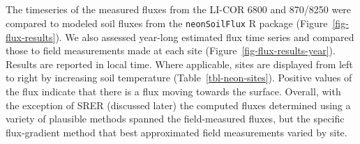 \documentclass[
  letterpaper,
  DIV=11,
  numbers=noendperiod]{scrartcl}
\providecommand{\DIFdelbegin}{} %
\providecommand{\DIFdelend}{} %
\newcommand{\DIFscaledelfig}{0.5}
\newlength{\DIFdelgraphicswidth} %
\newlength{\DIFdelgraphicsheight} %
\newcommand{\DIFdelincludegraphics}[2][]{%
\sbox{\DIFdelgraphicsbox}{\DIFOincludegraphics[#1]{#2}}%
\settoboxwidth{\DIFdelgraphicswidth}{\DIFdelgraphicsbox} %
\settoboxtotalheight{\DIFdelgraphicsheight}{\DIFdelgraphicsbox} %
\scalebox{\DIFscaledelfig}{%
\parbox[b]{\DIFdelgraphicswidth}{\usebox{\DIFdelgraphicsbox}\\[-\baselineskip] \rule{\DIFdelgraphicswidth}{0em}}\llap{\resizebox{\DIFdelgraphicswidth}{\DIFdelgraphicsheight}{%
\setlength{\unitlength}{\DIFdelgraphicswidth}%
\begin{picture}(1,1)%
\thicklines\linethickness{2pt} %
{\color[rgb]{1,0,0}\put(0,0){\framebox(1,1){}}}%
{\color[rgb]{1,0,0}\put(0,0){\line( 1,1){1}}}%
{\color[rgb]{1,0,0}\put(0,1){\line(1,-1){1}}}%
\end{picture}%
}\hspace*{3pt}}} %
} %
\DeclareRobustCommand{\DIFdelbegin}{\DIFOdelbegin \let\includegraphics\DIFdelincludegraphics} %
\DeclareRobustCommand{\DIFdelend}{\DIFOaddend \let\includegraphics\DIFOincludegraphics} %
\begin{document}
\begin{table}

\caption{\label{tbl-licor-results}Summary of measured soil
characteristics and flux results from field measurements across six NEON
sites using a LI-COR 6800 (LI-870/8250 measurements omitted to enable
direct comparability) via the closed-dynamic chamber method. Numeric
values for soil CO\(_{2}\) flux, soil temperature, and volumetric soil
water content (VSWC) are the mean and standard deviation of field
measurements at each site.}


\end{table}%

\DIFdelbegin \subsection{%
}%
\addtocounter{subsection}{-1}%

\DIFdelend The timeseries of the measured fluxes from the LI-COR 6800 and 870/8250
were compared to modeled soil fluxes from the \texttt{neonSoilFlux} R
package (Figure~\ref{fig-flux-results}). We also assessed year-long
estimated flux time series and compared those to field measurements made
at each site (Figure~\ref{fig-flux-results-year}). Results are reported
in local time. Where applicable, sites are displayed from left to right
by increasing soil temperature (Table~\ref{tbl-neon-sites}). Positive
values of the flux indicate that there is a flux moving towards the
surface. Overall, with the exception of SRER (discussed later) the
computed fluxes determined using a variety of plausible methods spanned
the field-measured fluxes, but the specific flux-gradient method that
best approximated field measurements varied by site.
\end{document}
